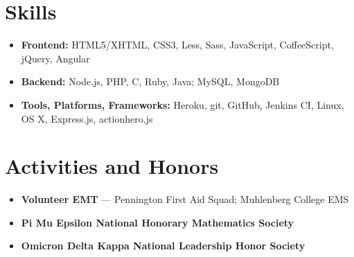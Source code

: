 \documentclass[11pt]{article}
\begin{document}
\section*{Skills}
\begin{itemize}
  \item \textbf{Frontend:} HTML5/XHTML, CSS3, Less, Sass, JavaScript, CoffeeScript, jQuery, Angular
  \item \textbf{Backend:} Node.js, PHP, C, Ruby, Java; MySQL, MongoDB
  \item \textbf{Tools, Platforms, Frameworks:} Heroku, git, GitHub, Jenkins CI, Linux, OS X, Express.js, actionhero.js
\end{itemize}



\section*{Activities and Honors}
\begin{itemize}
  \item \textbf{Volunteer EMT} --- Pennington First Aid Squad; Muhlenberg College EMS
  \item \textbf{Pi Mu Epsilon National Honorary Mathematics Society}
  \item \textbf{Omicron Delta Kappa National Leadership Honor Society}
\end{itemize}
\end{document}
